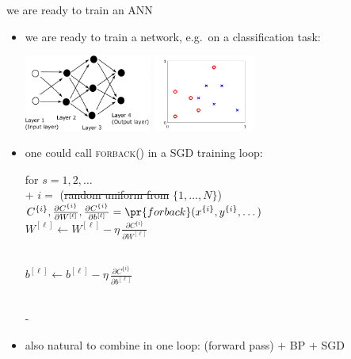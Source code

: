 \documentclass[xcolor={svgnames},
               hyperref={colorlinks,citecolor=DeepPink4,linkcolor=FireBrick,urlcolor=Maroon}]
               {beamer}
\begin{document}
\begin{frame}{we are ready to train an ANN}

\begin{itemize}
\item we are ready to train a network, e.g.~on a classification task:

\medskip
\hspace{5mm} \includegraphics[height=25mm]{figs/network.png} \hfill \includegraphics[height=25mm]{figs/fig1netbp} \hspace{10mm}

\item one could call \textsc{forback()} in a SGD training loop:

\begin{pseudo*}
for $s = 1,2,\dots$ \\+
    $i=$ (\st{random uniform from} $\{1,\dots,N\}$) \\
    $C^{\{i\}},\frac{\partial C^{\{i\}}}{\partial W^{[\ell]}},\frac{\partial C^{\{i\}}}{\partial b^{[\ell]}} = \pr{forback}(x^{\{i\}},y^{\{i\}},\dots)$ \\
    $W^{[\ell]} \gets W^{[\ell]} - \eta\, \frac{\partial C^{\{i\}}}{\partial W^{[\ell]}}$ {\Large \strut}\\
    $b^{[\ell]} \gets b^{[\ell]} - \eta\, \frac{\partial C^{\{i\}}}{\partial b^{[\ell]}}$ {\Large \strut} \\-
\end{pseudo*}

\item also natural to combine in one loop: (forward pass) $+$ BP $+$ SGD
\end{itemize}
\end{frame}
\end{document}

